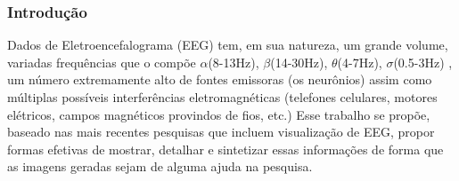 \begin{frame}
	\frametitle{Introdução}
	\par Dados de Eletroencefalograma (EEG) tem, em sua natureza, um grande volume, variadas frequências que o compõe $\alpha$(8-13Hz), $\beta$(14-30Hz), $\theta$(4-7Hz), $\sigma$(0.5-3Hz) \cite{8937083}, um número extremamente alto de fontes emissoras (os neurônios) assim como múltiplas possíveis interferências eletromagnéticas (telefones celulares, motores elétricos, campos magnéticos provindos de fios, etc.) Esse trabalho se propõe, baseado nas mais recentes pesquisas que incluem visualização de EEG, propor formas efetivas de mostrar, detalhar e sintetizar essas informações de forma que as imagens geradas sejam de alguma ajuda na pesquisa.
\end{frame}
